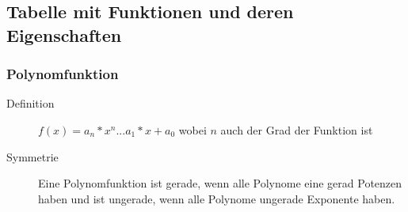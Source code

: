 \documentclass[a4paper]{scrartcl}
\begin{document}
    \subsection{Tabelle mit Funktionen und deren Eigenschaften}
        \subsubsection{Polynomfunktion}        
        \begin{description}
            \item[Definition] $f(x) = a_n*x^n...a_1*x + a_0$ wobei $n$ auch der Grad der Funktion ist
            \item[Symmetrie] Eine Polynomfunktion ist gerade, wenn alle Polynome eine gerad Potenzen haben und ist ungerade, wenn alle Polynome ungerade Exponente haben.
        \end{description}
\end{document}
